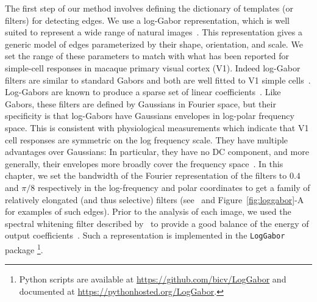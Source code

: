 \documentclass[a4paper, 11pt]{book}
\begin{document}
The first step of our method involves defining the dictionary of templates (or
filters) for detecting edges.
We use a log-Gabor representation, which is well suited to represent
a wide range of natural images~\citep{Fischer07}.
This representation gives a generic model of edges parameterized by their shape,
orientation, and scale. We set the range of these parameters to match with what has been reported
for simple-cell responses in macaque primary visual cortex (V1).
Indeed log-Gabor filters are similar to standard Gabors and both are well fitted to V1 simple cells~\citep{Daugman80}.
Log-Gabors are known to produce a sparse set of linear coefficients~\citep{Field99}.
Like Gabors, these filters are defined by Gaussians in Fourier space,
but their specificity is that log-Gabors have Gaussians envelopes in log-polar frequency space.
This is consistent with physiological measurements which indicate that V1 cell responses are symmetric on the log frequency scale.
They have multiple advantages over Gaussians:
In particular, they have no DC component,
and more generally, their envelopes more broadly cover the frequency space~\citep{Fischer07cv}.
In this chapter, we set the bandwidth of the Fourier representation of the filters
to $0.4$ and $\pi/8$ respectively in the log-frequency and polar coordinates
to get a family of relatively elongated (and thus selective) filters
(see~\citet{Fischer07cv} and Figure~\ref{fig:loggabor}-A for examples of such edges).
Prior to the analysis of each image, we used the spectral whitening filter
described by~\citet{Olshausen97} to provide
a good balance of the energy of output coefficients~\citep{Perrinet03ieee,Fischer07}.
Such a representation is implemented in the \verb+LogGabor+ package
\footnote{Python scripts are available at \url{https://github.com/bicv/LogGabor}
and documented at \url{https://pythonhosted.org/LogGabor}.}.
\end{document}
